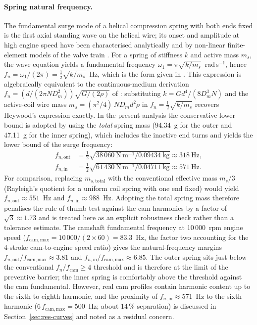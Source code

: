 \paragraph{Spring natural frequency.}
The fundamental surge mode of a helical compression spring with both
ends fixed is the first axial standing wave on the helical wire; its
onset and amplitude at high engine speed have been characterised
analytically and by non-linear finite-element models of the valve
train \citep{liu2011estimation,gu2020nonlinear,ozlen2025integrated}. For
a spring of stiffness $k$ and active mass $m_{s}$, the wave equation
yields a fundamental frequency
$\omega_{1}=\pi\sqrt{k/m_{s}}$~rad\,s$^{-1}$, hence
$f_{n}=\omega_{1}/(2\pi)=\tfrac{1}{2}\sqrt{k/m_{s}}$~Hz, which is the
form given in \citet[Eq.~10-26]{shigley2020}. This expression is
algebraically equivalent to the continuous-medium derivation
$f_{n}=(d/(2\pi N D_{m}^{2}))\sqrt{G/(2\rho)}$ of
\citet[\S~6.6]{heywood1988}: substituting
$k=Gd^{4}/(8 D_{m}^{3} N)$ and the active-coil wire mass
$m_{s}=(\pi^{2}/4)\,N D_{m} d^{2} \rho$ in
$f_{n}=\tfrac{1}{2}\sqrt{k/m_{s}}$ recovers Heywood's expression
exactly. In the present analysis the conservative lower bound is
adopted by using the \emph{total} spring mass (94.34~g for the outer
and 47.11~g for the inner spring), which includes the inactive end
turns and yields the lower bound of the surge frequency:
\begin{align}
f_{n,\mathrm{out}}&=\tfrac{1}{2}\sqrt{38\,060~\mathrm{N\,m^{-1}}/0.09434~\mathrm{kg}}\approx 318~\mathrm{Hz},\label{eq:fn-out}\\
f_{n,\mathrm{in}} &=\tfrac{1}{2}\sqrt{61\,430~\mathrm{N\,m^{-1}}/0.04711~\mathrm{kg}}\approx 571~\mathrm{Hz}.\label{eq:fn-in}
\end{align}
For comparison, replacing $m_{s,\mathrm{total}}$ with the conventional
effective mass $m_{s}/3$ (Rayleigh's quotient for a uniform coil
spring with one end fixed) would yield $f_{n,\mathrm{out}}\approx
551$~Hz and $f_{n,\mathrm{in}}\approx 988$~Hz. Adopting the total
spring mass therefore penalises the rule-of-thumb test against the
cam harmonics by a factor of $\sqrt{3}\approx 1.73$ and is treated
here as an explicit robustness check rather than a tolerance estimate.
The camshaft fundamental frequency at 10\,000~rpm engine speed
($f_{\mathrm{cam,max}}=10\,000/(2\times 60)=83.3$~Hz, the factor
two accounting for the 4-stroke cam-to-engine speed ratio) gives
the natural-frequency margins
$f_{n,\mathrm{out}}/f_{\mathrm{cam,max}}\approx 3.81$ and
$f_{n,\mathrm{in}}/f_{\mathrm{cam,max}}\approx 6.85$. The outer
spring sits just below the conventional
$f_{n}/f_{\mathrm{cam}}\geq 4$ threshold \citep{heywood1988} and is
therefore at the limit of the preventive barrier; the inner spring
is comfortably above the threshold against the cam fundamental.
However, real cam profiles contain harmonic content up to the sixth
to eighth harmonic, and the proximity of $f_{n,\mathrm{in}}\approx
571$~Hz to the sixth harmonic
($6\,f_{\mathrm{cam,max}}=500$~Hz; about 14\,\% separation) is
discussed in Section~\ref{sec:res-curves} and noted as a residual
concern.

